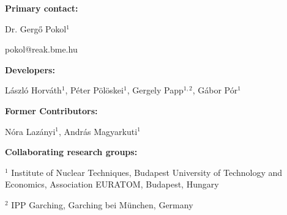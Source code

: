 \textbf{Primary contact:}

Dr. Gerg\H{o} Pokol$^{1}$

pokol@reak.bme.hu

\vspace{1 cm}
\textbf{Developers:}

László Horváth$^{1}$, Péter Pölöskei$^{1}$, Gergely Papp$^{1,2}$, Gábor Pór$^{1}$

\vspace{1 cm}
\textbf{Former Contributors:}

Nóra Lazányi$^{1}$, András Magyarkuti$^{1}$

\vspace{1 cm}
\textbf{Collaborating research groups:}

$^{1}$ Institute of Nuclear Techniques, Budapest University of Technology and Economics, Association EURATOM, Budapest, Hungary

$^{2}$ IPP Garching, Garching bei München, Germany

